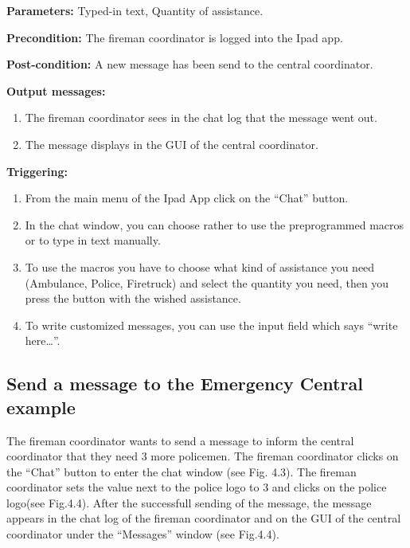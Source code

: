 \begin{description}

\item \textbf{Parameters:} Typed-in text, Quantity of assistance.
\item \textbf{Precondition:} The fireman coordinator is logged into the Ipad
app.
\item \textbf{Post-condition:} A new message has been send to the central
coordinator. 
\item \textbf{Output messages:}
\begin{enumerate}
  \item The fireman coordinator sees in the chat log that the message went out.
  \item The message displays in the GUI of the central coordinator.
\end{enumerate}

\item \textbf{Triggering:}
\begin{enumerate}
  \item From the main menu of the Ipad App click on the “Chat” button.
  \item In the chat window, you can choose rather to use the preprogrammed
  macros or to type in text manually.
  \item To use the macros you have to choose what kind of assistance you need
  (Ambulance, Police, Firetruck) and select the quantity you need, then you
  press the button with the wished assistance.
  \item To write customized messages, you can use the input field which says
  “write here\ldots”.
\end{enumerate}
\end{description}

 
\subsection{Send a message to the Emergency Central example}
The fireman coordinator wants to send a message to inform the central
coordinator that they need 3 more policemen. The fireman coordinator clicks on
the “Chat” button to enter the chat window (see Fig. 4.3). The fireman
coordinator sets the value next to the police logo to 3 and clicks on the
police logo(see Fig.4.4).
After the successfull sending of the message, the message
appears in the chat log of the fireman coordinator and on the GUI of the central
coordinator under the “Messages” window (see Fig.4.4).

